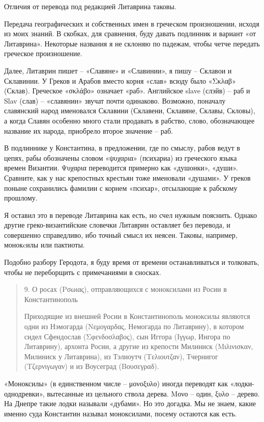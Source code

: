 Отличия от перевода под редакцией Литаврина таковы.

Передача географических и собственных имен в греческом произношении, исходя из моих знаний. В скобках, для сравнения, буду давать подлинник и вариант «от Литаврина». Некоторые названия я не склоняю по падежам, чтобы четче передать греческое произношение.

Далее, Литаврин пишет – «Славяне» и «Славинии», я пишу – Склавои и Склавинии. У Греков и Арабов вместо корня «слав» всюду было «Σκλαβ» (Склав). Греческое «σκλάβο» означает «раб». Английское slave (слэйв) – раб и Slav (слав) – «славянин» звучат почти одинаково. Возможно, поначалу славянский народ именовался Склавини (Склавени, Склавяне, Склавы, Скловы), а когда Славян особенно много стали продавать в рабство,  слово, обозначающее название их народа, приобрело второе значение – раб.

В подлиннике у Константина, в предложении, где по смыслу, рабов ведут в цепях, рабы обозначены словом «ψυχαρια» (психариа) из греческого языка времен Византии. Ψυχαρια переводится примерно как «душонки», «души». Сравните, как у нас крепостных крестьян тоже именовали «душами». У греков поныне сохранились фамилии с корнем «психар», отсылающие к рабскому прошлому. 

Я оставил это в переводе Литаврина как есть, но счел нужным пояснить. Однако другие греко-византийские словечки Литаврин оставляет без перевода, и совершенно справедливо, ибо точный смысл их неясен. Таковы, например, монокcилы или пактиоты.

Подобно разбору Геродота, я буду время от времени останавливаться и толковать, чтобы не переборщить с примечаниями в сносках.

\begin{quotation}
9. О росах (Ρσωιας), отправляющихся с моноксилами из Росии в Константинополь

Приходящие из внешней Росии в Константинополь моноксилы являются одни из Нэмогарда (Νεμο\-γαρδας, Немогарда по Литаврину), в котором сидел Сфендослав (Σφενδοσλαβος), сын Иггора (Ιγγωρ, Ингора по Литаврину), архонта Росии, а другие из крепости Милиниск (Μιλινισκαν, Милиниск у Литаврина), из Тэлиоутч (Τελιουτζαν), Тчернигог (Τζερνιγ\-ωγαν) и из Воусеград (Βουσεγραδ). 
\end{quotation}

«Моноксилы» (в единственном числе – μονοξυλο) иногда переводят как «лодки-однодревки», вытесанные из цельного ствола дерева. Μονο – один, ξυλο – дерево. На Днепре такие лодки называли «дубами». Но это догадка. Мы не знаем, какие именно суда Константин называл моноксилами, посему остаются как есть.

